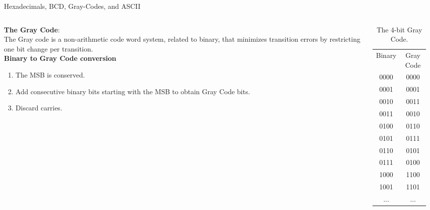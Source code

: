 \documentclass{beamer}
\begin{document}
\begin{frame}{Hexadecimals, BCD, Gray-Codes, and ASCII}
\small
\begin{columns}[T]
\begin{column}{0.5\textwidth}
\textbf{The Gray Code}: \\ \vspace{0.5cm}
The Gray code is a non-arithmetic code word system, related to binary, that minimizes transition errors by restricting one bit change per transition. \\ \vspace{0.5cm}
\textbf{Binary to Gray Code conversion}
\begin{enumerate}
\item The MSB is conserved.
\item Add consecutive binary bits starting with the MSB to obtain Gray Code bits.
\item Discard carries.
\end{enumerate}
\end{column}
\begin{column}{0.5\textwidth}
\begin{table}
\centering
\begin{tabular}{c c}
Binary & Gray Code \\
0000 & 0000 \\
0001 & 0001 \\
0010 & 0011 \\
0011 & 0010 \\
0100 & 0110 \\
0101 & 0111 \\
0110 & 0101 \\
0111 & 0100 \\
1000 & 1100 \\
1001 & 1101 \\
... & ... 
\end{tabular}
\caption{\label{tab:grayCode} \small The 4-bit Gray Code.}
\end{table}
\end{column}
\end{columns}
\end{frame}
\end{document}

